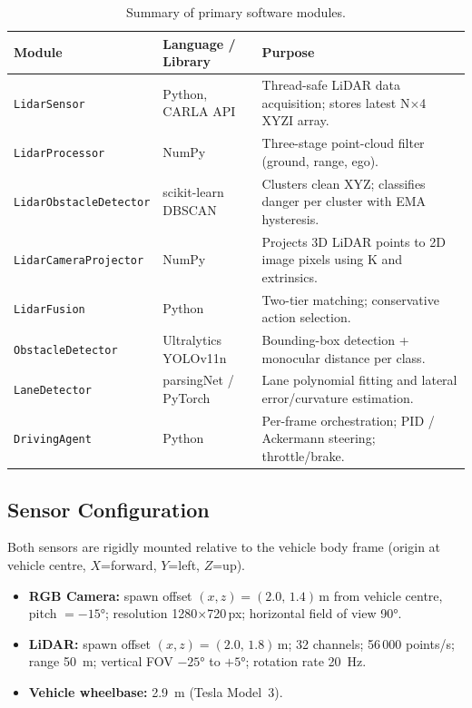 \documentclass[12pt,a4paper]{article}
\begin{document}
\begin{table}[H]
\centering
\caption{Summary of primary software modules.}
\label{tab:modules}
\begin{tabularx}{\textwidth}{@{}l l X@{}}
\toprule
\textbf{Module} & \textbf{Language / Library} & \textbf{Purpose} \\
\midrule
\texttt{LidarSensor}           & Python, CARLA API    &
  Thread-safe LiDAR data acquisition; stores latest N$\times$4 XYZI array. \\
\texttt{LidarProcessor}        & NumPy                &
  Three-stage point-cloud filter (ground, range, ego). \\
\texttt{LidarObstacleDetector} & scikit-learn DBSCAN  &
  Clusters clean XYZ; classifies danger per cluster with EMA hysteresis. \\
\texttt{LidarCameraProjector}  & NumPy                &
  Projects 3D LiDAR points to 2D image pixels using K and extrinsics. \\
\texttt{LidarFusion}           & Python               &
  Two-tier matching; conservative action selection. \\
\texttt{ObstacleDetector}      & Ultralytics YOLOv11n &
  Bounding-box detection + monocular distance per class. \\
\texttt{LaneDetector}          & parsingNet / PyTorch &
  Lane polynomial fitting and lateral error/curvature estimation. \\
\texttt{DrivingAgent}          & Python               &
  Per-frame orchestration; PID / Ackermann steering; throttle/brake. \\
\bottomrule
\end{tabularx}
\end{table}

\subsection{Sensor Configuration}
\label{subsec:sensor_config}

Both sensors are rigidly mounted relative to the vehicle body frame (origin at
vehicle centre, $X$=forward, $Y$=left, $Z$=up).

\begin{itemize}[nosep]
  \item \textbf{RGB Camera:} spawn offset $(x, z) = (2.0,\,1.4)$\,m from
        vehicle centre, pitch $= -15°$; resolution 1280$\times$720\,px;
        horizontal field of view 90°.
  \item \textbf{LiDAR:} spawn offset $(x, z) = (2.0,\,1.8)$\,m; 32 channels;
        56\,000 points/s; range \SI{50}{\metre}; vertical FOV $-25°$ to
        $+5°$; rotation rate \SI{20}{\hertz}.
  \item \textbf{Vehicle wheelbase:} \SI{2.9}{\metre} (Tesla Model~3).
\end{itemize}
\end{document}
